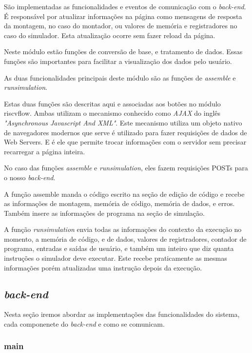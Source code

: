 				São implementadas as funcionalidades e eventos de comunicação com o \textit{back-end}. É responsável por atualizar informações na página como mensagens de resposta da montagem, no caso do montador, ou valores de memória e registradores no caso do simulador. Esta atualização ocorre sem fazer reload da página.

				Neste módulo estão funções de conversão de base, e tratamento de dados. Essas funções são importantes para facilitar a visualização dos dados pelo usuário.

				As duas funcionalidades principais deste módulo são as funções de \textit{assemble} e \textit{run\textunderscore simulation}. 

				Estas duas funções são descritas aqui e associadas aos botões no módulo riscv\textunderscore flow. Ambas utilizam o mecanismo conhecido como \textit{AJAX} do inglês \textit{"Asynchronous Javascript And XML"}. Este mecanismo utiliza um objeto nativo de navegadores modernos que serve é utilizado para fazer requisições de dados de Web Servers. E é ele que permite trocar informações com o servidor sem precisar recarregar a página inteira.

				No caso das funções \textit{assemble} e \textit{run\textunderscore simulation}, eles fazem requisições POSTs para o nosso \textit{back-end}.

				A função assemble manda o código escrito na seção de edição de código e recebe as informações de montagem, memória de código, memória de dados, e erros. Também insere as informações de programa na seção de simulação.

				A função \textit{run\textunderscore simulation} envia todas as informações do contexto da execução no momento, a memória de código, e de dados, valores de registradores, contador de programa, entradas e saídas de usuário, e também um inteiro que diz quanta instruções o simulador deve executar. Este recebe praticamente as mesmas informações porém atualizadas uma instrução depois da execução.


	\subsection{\textit{back-end}}

		Nesta seção iremos abordar as implementações das funcionalidades do sistema, cada componenete do \textit{back-end} e como se comunicam.

		\subsubsection{main}

